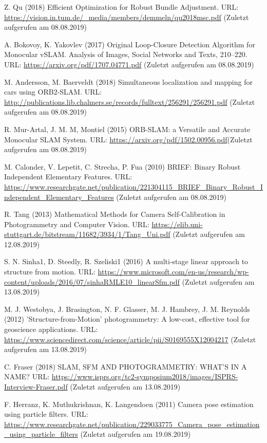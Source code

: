 \documentclass[12pt,oneside]{scrreprt}
\begin{document}
\begin{thebibliography}{10}
 Z. Qu (2018) Efficient Optimization for
Robust Bundle Adjustment. URL: \url{https://vision.in.tum.de/_media/members/demmeln/qu2018msc.pdf}  (Zuletzt aufgerufen am 08.08.2019)

 A. Bokovoy, K. Yakovlev (2017) Original Loop-Closure Detection Algorithm for Monocular vSLAM. Analysis of Images, Social Networks and Texts, 210–220. URL: \url{https://arxiv.org/pdf/1707.04771.pdf} (Zuletzt aufgerufen am 08.08.2019)

 M. Andersson, M. Baerveldt (2018) Simultaneous localization and mapping
for cars using ORB2-SLAM. URL: \url{http://publications.lib.chalmers.se/records/fulltext/256291/256291.pdf} (Zuletzt aufgerufen am 08.08.2019)

  R. Mur-Artal, J. M. M, Montiel (2015) ORB-SLAM: a Versatile and Accurate Monocular SLAM System. URL: \url{https://arxiv.org/pdf/1502.00956.pdf}(Zuletzt aufgerufen am 08.08.2019)

 M. Calonder, V. Lepetit, C. Strecha, P. Fua (2010) BRIEF: Binary Robust Independent Elementary Features. URL: \url{https://www.researchgate.net/publication/221304115_BRIEF_Binary_Robust_Independent_Elementary_Features} (Zuletzt aufgerufen am 08.08.2019)

 R. Tang (2013) Mathematical Methods for Camera Self-Calibration
in Photogrammetry and Computer Vision. URL: \url{https://elib.uni-stuttgart.de/bitstream/11682/3934/1/Tang_Uni.pdf} (Zuletzt aufgerufen am 12.08.2019)

 S. N. Sinha1, D. Steedly, R. Szeliski1 (2016) A multi-stage linear approach to structure from motion. URL: \url{https://www.microsoft.com/en-us/research/wp-content/uploads/2016/07/sinhaRMLE10_linearSfm.pdf} (Zuletzt aufgerufen am 13.08.2019)

 M. J. Westobya, J. Brasington, N. F. Glasser, M. J. Hambrey, J. M. Reynolds (2012) 'Structure-from-Motion' photogrammetry: A low-cost, effective tool for geoscience applications. URL: \url{https://www.sciencedirect.com/science/article/pii/S0169555X12004217} (Zuletzt aufgerufen am 13.08.2019)

 C. Fraser (2018) SLAM, SFM AND PHOTOGRAMMETRY: WHAT’S IN A NAME? URL: \url{https://www.isprs.org/tc2-symposium2018/images/ISPRS-Interview-Fraser.pdf} (Zuletzt aufgerufen am 13.08.2019)

 F. Herranz, K. Muthukrishnan, K. Langendoen (2011) Camera pose estimation using particle filters. URL: \url{https://www.researchgate.net/publication/229033775_Camera_pose_estimation_using_particle_filters} (Zuletzt aufgerufen am 19.08.2019)


\end{thebibliography}
\end{document}
